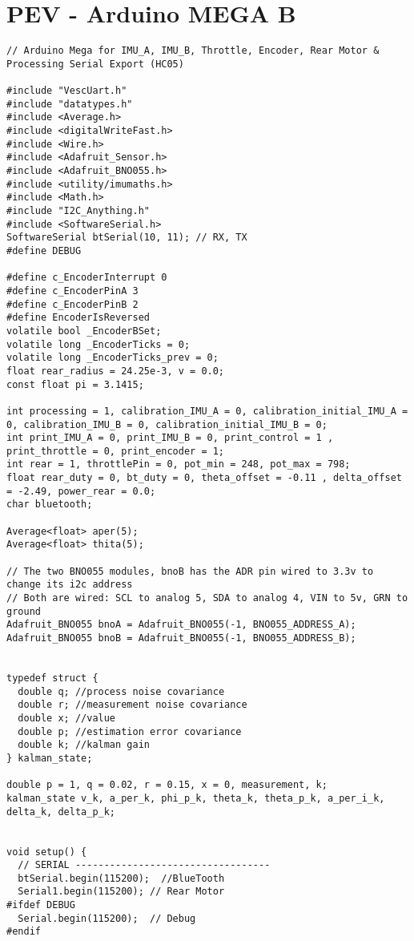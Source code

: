 \section{PEV - Arduino MEGA B}
\begin{lstlisting}[style=codearduino]
// Arduino Mega for IMU_A, IMU_B, Throttle, Encoder, Rear Motor & Processing Serial Export (HC05)

#include "VescUart.h"
#include "datatypes.h"
#include <Average.h>
#include <digitalWriteFast.h>
#include <Wire.h>
#include <Adafruit_Sensor.h>
#include <Adafruit_BNO055.h>
#include <utility/imumaths.h>
#include <Math.h>
#include "I2C_Anything.h"
#include <SoftwareSerial.h>
SoftwareSerial btSerial(10, 11); // RX, TX
#define DEBUG

#define c_EncoderInterrupt 0
#define c_EncoderPinA 3
#define c_EncoderPinB 2
#define EncoderIsReversed
volatile bool _EncoderBSet;
volatile long _EncoderTicks = 0;
volatile long _EncoderTicks_prev = 0;
float rear_radius = 24.25e-3, v = 0.0;
const float pi = 3.1415;

int processing = 1, calibration_IMU_A = 0, calibration_initial_IMU_A = 0, calibration_IMU_B = 0, calibration_initial_IMU_B = 0;
int print_IMU_A = 0, print_IMU_B = 0, print_control = 1 , print_throttle = 0, print_encoder = 1;
int rear = 1, throttlePin = 0, pot_min = 248, pot_max = 798;
float rear_duty = 0, bt_duty = 0, theta_offset = -0.11 , delta_offset = -2.49, power_rear = 0.0;
char bluetooth;

Average<float> aper(5);
Average<float> thita(5);

// The two BNO055 modules, bnoB has the ADR pin wired to 3.3v to change its i2c address
// Both are wired: SCL to analog 5, SDA to analog 4, VIN to 5v, GRN to ground
Adafruit_BNO055 bnoA = Adafruit_BNO055(-1, BNO055_ADDRESS_A);
Adafruit_BNO055 bnoB = Adafruit_BNO055(-1, BNO055_ADDRESS_B);


typedef struct {
  double q; //process noise covariance
  double r; //measurement noise covariance
  double x; //value
  double p; //estimation error covariance
  double k; //kalman gain
} kalman_state;

double p = 1, q = 0.02, r = 0.15, x = 0, measurement, k;
kalman_state v_k, a_per_k, phi_p_k, theta_k, theta_p_k, a_per_i_k, delta_k, delta_p_k;


void setup() {
  // SERIAL ----------------------------------
  btSerial.begin(115200);  //BlueTooth
  Serial1.begin(115200); // Rear Motor
#ifdef DEBUG
  Serial.begin(115200);  // Debug
#endif


\end{lstlisting}
